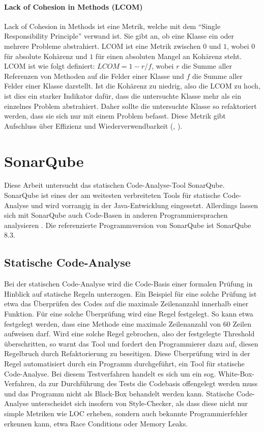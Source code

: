 \documentclass[a4paper, 12pt]{article}
\begin{document}
\paragraph{Lack of Cohesion in Methods (LCOM)}
Lack of Cohesion in Methods ist eine Metrik, welche mit dem \enquote{Single Responsibility Principle} verwand ist.
Sie gibt an, ob eine Klasse ein oder mehrere Probleme abstrahiert.
LCOM ist eine Metrik zwischen $0$ und $1$, wobei $0$ für absolute Kohärenz und $1$ für einen absoluten Mangel an Kohärenz steht.
LCOM ist wie folgt definiert:  $LCOM = 1 - r / f$, wobei $r$ die Summe aller Referenzen von Methoden auf die Felder einer Klasse und $f$ die Summe aller Felder einer Klasse darstellt.
Ist die Kohärenz zu niedrig, also die LCOM zu hoch, ist dies ein starker Indikator dafür, dass die untersuchte Klasse mehr als ein einzelnes Problem abstrahiert.
Daher sollte die untersuchte Klasse so refaktoriert werden, dass sie sich nur mit einem Problem befasst.
Diese Metrik gibt Aufschluss über Effizienz und Wiederverwendbarkeit (\textcite{Metrics_OO_design}, \textcite{Linda_softwarequality}).

\section{SonarQube}

Diese Arbeit untersucht das statischen Code-Analyse-Tool SonarQube.
SonarQube ist eines der am weitesten verbreiteten Tools für statische Code-Analyse und wird vorrangig in der Java-Entwicklung eingesetzt.
Allerdings lassen sich mit SonarQube auch Code-Basen in anderen Programmiersprachen analysieren \parencite{sonarqube_languages}.
Die referenzierte Programmversion von SonarQube ist SonarQube 8.3.

\subsection{Statische Code-Analyse}
Bei der statischen Code-Analyse wird die Code-Basis einer formalen Prüfung in Hinblick auf statische Regeln unterzogen.
Ein Beispiel für eine solche Prüfung ist etwa das Überprüfen des Codes auf die maximale Zeilenanzahl innerhalb einer Funktion.
Für eine solche Überprüfung wird eine Regel festgelegt.
So kann etwa festgelegt werden, dass eine Methode eine maximale Zeilenanzahl von 60 Zeilen aufweisen darf.
Wird eine solche Regel gebrochen, also der festgelegte Threshold überschritten, so warnt das Tool und fordert den Programmierer dazu auf, diesen Regelbruch durch Refaktorierung zu beseitigen.
Diese Überprüfung wird in der Regel automatisiert durch ein Programm durchgeführt, ein Tool für statische Code-Analyse.
Bei diesem Testverfahren handelt es sich um ein sog. White-Box-Verfahren, da zur Durchführung des Tests die Codebasis offengelegt werden muss und das Programm nicht als Black-Box behandelt werden kann.
Statische Code-Analyse unterscheidet sich insofern von Style-Checker, als dass diese nicht nur simple Metriken wie LOC erheben, sondern auch bekannte Programmierfehler erkennen kann, etwa Race Conditions oder Memory Leaks.
\end{document}
